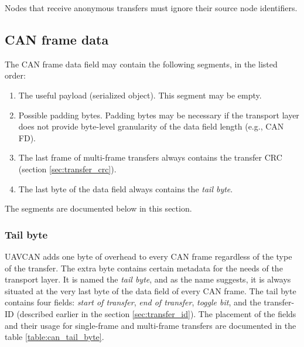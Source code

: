 Nodes that receive anonymous transfers must ignore their source node identifiers.

\subsection{CAN frame data}

The CAN frame data field may contain the following segments, in the listed order:
\begin{samepage}
\begin{enumerate}
    \item The useful payload (serialized object). This segment may be empty.
    \item Possible padding bytes.
          Padding bytes may be necessary if the transport layer does not provide byte-level
          granularity of the data field length (e.g., CAN FD).
    \item The last frame of multi-frame transfers always contains the transfer CRC (section \ref{sec:transfer_crc}).
    \item The last byte of the data field always contains the \emph{tail byte}.
\end{enumerate}
\end{samepage}
The segments are documented below in this section.

\subsubsection{Tail byte}

UAVCAN adds one byte of overhead to every CAN frame regardless of the type of the transfer.
The extra byte contains certain metadata for the needs of the transport layer.
It is named the \emph{tail byte}, and as the name suggests, it is always situated
at the very last byte of the data field of every CAN frame.
The tail byte contains four fields: \emph{start of transfer}, \emph{end of transfer},
\emph{toggle bit}, and the transfer-ID (described earlier in the section \ref{sec:transfer_id}).
The placement of the fields and their usage for single-frame and multi-frame transfers
are documented in the table \ref{table:can_tail_byte}.

